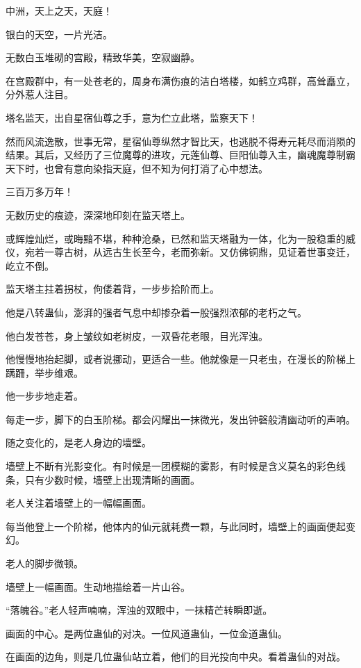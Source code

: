 
\begin{this_body}

中洲，天上之天，天庭！

银白的天空，一片光洁。

无数白玉堆砌的宫殿，精致华美，空寂幽静。

在宫殿群中，有一处苍老的，周身布满伤痕的洁白塔楼，如鹤立鸡群，高耸矗立，分外惹人注目。

塔名监天，出自星宿仙尊之手，意为伫立此塔，监察天下！

然而风流逸散，世事无常，星宿仙尊纵然才智比天，也逃脱不得寿元耗尽而消陨的结果。其后，又经历了三位魔尊的进攻，元莲仙尊、巨阳仙尊入主，幽魂魔尊制霸天下时，也曾有意向染指天庭，但不知为何打消了心中想法。

三百万多万年！

无数历史的痕迹，深深地印刻在监天塔上。

或辉煌灿烂，或晦黯不堪，种种沧桑，已然和监天塔融为一体，化为一股稳重的威仪，宛若一尊古树，从远古生长至今，老而弥新。又仿佛铜鼎，见证着世事变迁，屹立不倒。

监天塔主拄着拐杖，佝偻着背，一步步拾阶而上。

他是八转蛊仙，澎湃的强者气息中却掺杂着一股强烈浓郁的老朽之气。

他白发苍苍，身上皱纹如老树皮，一双昏花老眼，目光浑浊。

他慢慢地抬起脚，或者说挪动，更适合一些。他就像是一只老虫，在漫长的阶梯上蹒跚，举步维艰。

他一步步地走着。

每走一步，脚下的白玉阶梯。都会闪耀出一抹微光，发出钟磬般清幽动听的声响。

随之变化的，是老人身边的墙壁。

墙壁上不断有光影变化。有时候是一团模糊的雾影，有时候是含义莫名的彩色线条，只有少数时候，墙壁上出现清晰的画面。

老人关注着墙壁上的一幅幅画面。

每当他登上一个阶梯，他体内的仙元就耗费一颗，与此同时，墙壁上的画面便起变幻。

老人的脚步微顿。

墙壁上一幅画面。生动地描绘着一片山谷。

“落魄谷。”老人轻声喃喃，浑浊的双眼中，一抹精芒转瞬即逝。

画面的中心。是两位蛊仙的对决。一位风道蛊仙，一位金道蛊仙。

在画面的边角，则是几位蛊仙站立着，他们的目光投向中央。看着蛊仙的对战。


\end{this_body}
